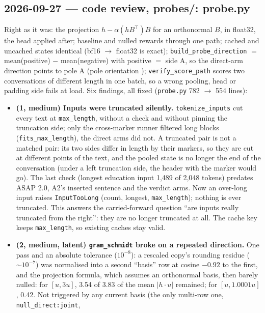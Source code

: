\documentclass{article}
\begin{document}
\subsection*{2026-09-27 --- code review, probes/: probe.py}
Right as it was: the projection $h-\alpha(hB^\top)B$ for an orthonormal $B$, in float32, the head applied after;
baseline and nulled rewards through one path; cached and uncached states identical (bf16 $\to$ float32 is
exact); \texttt{build\_probe\_direction} $=$ mean(positive) $-$ mean(negative) with positive $=$ side A, so the
direct-arm direction points to pole A (pole orientation \checkmark); \texttt{verify\_score\_path} scores two
conversations of different length in one batch, so a wrong pooling, head or padding side fails at load. Six
findings, all fixed (\texttt{probe.py} 782 $\to$ 554 lines):
\begin{itemize}
  \item \textbf{(1, medium) Inputs were truncated silently.} \texttt{tokenize\_inputs} cut every text at
        \texttt{max\_length}, without a check and without pinning the truncation side; only the cross-marker
        runner filtered long blocks (\texttt{fits\_max\_length}), the direct arms did not. A truncated pair is
        not a matched pair: its two sides differ in length by their markers, so they are cut at different points
        of the text, and the pooled state is no longer the end of the conversation (under a left truncation side,
        the header with the marker would go). The last check (longest education input 1{,}489 of 2{,}048 tokens)
        predates ASAP 2.0, A2's inserted sentence and the verdict arms. Now an over-long input raises
        \texttt{InputTooLong} (count, longest, \texttt{max\_length}); nothing is ever truncated. This answers the
        carried-forward question ``are inputs really truncated from the right'': they are no longer truncated at
        all. The cache key keeps \texttt{max\_length}, so existing caches stay valid.
  \item \textbf{(2, medium, latent) \texttt{gram\_schmidt} broke on a repeated direction.} One pass and an
        absolute tolerance ($10^{-8}$): a rescaled copy's rounding residue ($\sim10^{-7}$) was normalised into a
        second ``basis'' row at cosine $-0.92$ to the first, and the projection formula, which assumes an
        orthonormal basis, then barely nulled: for $[u,3u]$, 3.54 of 3.83 of the mean $|h\cdot u|$ remained; for
        $[u,1.0001u]$, 0.42. Not triggered by any current basis (the only multi-row one, \texttt{null\_direct:joint},

\end{itemize}
\end{document}
